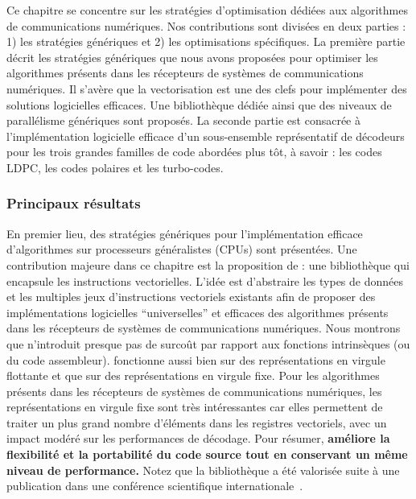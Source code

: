 Ce chapitre se concentre sur les stratégies d'optimisation dédiées aux
algorithmes de communications numériques. Nos contributions sont divisées en
deux parties : 1) les stratégies génériques et 2) les optimisations spécifiques.
La première partie décrit les stratégies génériques que nous avons proposées
pour optimiser les algorithmes présents dans les récepteurs de systèmes de
communications numériques. Il s'avère que la vectorisation est une des clefs
pour implémenter des solutions logicielles efficaces. Une bibliothèque dédiée
ainsi que des niveaux de parallélisme génériques sont proposés. La seconde
partie est consacrée à l'implémentation logicielle efficace d'un sous-ensemble
représentatif de décodeurs pour les trois grandes familles de code abordées plus
tôt, à savoir : les codes LDPC, les codes polaires et les turbo-codes.

\subsubsection*{Principaux résultats}

En premier lieu, des stratégies génériques pour l'implémentation efficace
d'algorithmes sur processeurs généralistes (CPUs) sont présentées. Une
contribution majeure dans ce chapitre est la proposition de \MIPP : une
bibliothèque qui encapsule les instructions vectorielles. L'idée est d'abstraire
les types de données et les multiples jeux d’instructions vectoriels existants
afin de proposer des implémentations logicielles ``universelles'' et efficaces
des algorithmes présents dans les récepteurs de systèmes de communications
numériques. Nous montrons que \MIPP n'introduit presque pas de surcoût par
rapport aux fonctions intrinsèques (ou du code assembleur). \MIPP fonctionne
aussi bien sur des représentations en virgule flottante et que sur des
représentations en virgule fixe. Pour les algorithmes présents dans les
récepteurs de systèmes de communications numériques, les représentations en
virgule fixe sont très intéressantes car elles permettent de traiter un plus
grand nombre d'éléments dans les registres vectoriels, avec un impact modéré sur
les performances de décodage. Pour résumer, \textbf{\MIPP améliore la
flexibilité et la portabilité du code source tout en conservant un même niveau
de performance.} Notez que la bibliothèque \MIPP a été valorisée suite à une
publication dans une conférence scientifique internationale~\cite{Cassagne2018}.

